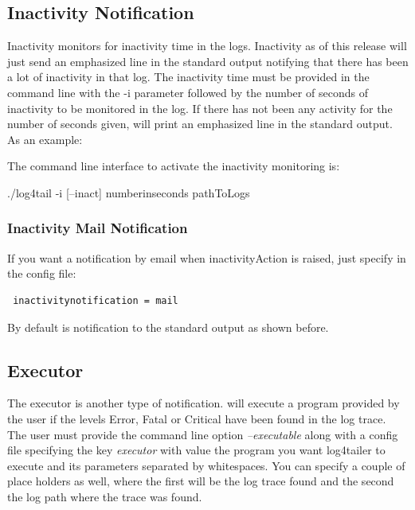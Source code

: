 \subsection{Inactivity Notification}
\label{sec:inactivitysection}
Inactivity monitors for inactivity time in the logs. Inactivity as of this release 
will just send an emphasized line in the standard output notifying that there has been 
a lot of inactivity in that log. The inactivity time must be provided in the command line 
with the -i parameter followed by the number of seconds of inactivity to be monitored in the log.
If there has not been any activity for the number of seconds given, \logftailer{} will print 
an emphasized line in the standard output.\\
As an example:\\
 
The command line interface to activate the inactivity monitoring is:
\begin{cmd}
 ./log4tail -i [--inact] numberinseconds pathToLogs
\end{cmd}

\subsubsection{Inactivity Mail Notification}
If you want a notification by email when inactivityAction is raised, just specify in the 
config file:

\begin{config}
\begin{verbatim}
 inactivitynotification = mail
\end{verbatim}
\end{config}

\noindent
By default is notification to the standard output as shown before. 

\subsection{Executor}
\label{sec:executor}

The executor is another type of notification. \logftailer{} will execute a program provided 
by the user if the levels Error, Fatal or Critical have been found in the log trace. The user 
must provide the command line option \emph{--executable} along with a config file specifying 
the key \emph{executor} with value the program you want log4tailer to execute and its parameters 
separated by whitespaces. You can specify a couple of place holders as well, where the first will 
be the log trace found and the second the log path where the trace was found.

